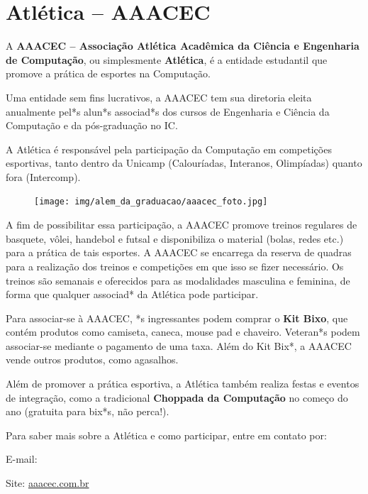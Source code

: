 
\section{Atlética -- AAACEC}

A \textbf{AAACEC -- Associação Atlética Acadêmica da Ciência e Engenharia de
Computação}, ou simplesmente \textbf{Atlética}, é a entidade estudantil que
promove a prática de esportes na Computação.

Uma entidade sem fins lucrativos, a AAACEC tem sua diretoria eleita anualmente
pel*s alun*s associad*s dos cursos de Engenharia e Ciência da Computação e da
pós-graduação no IC.

A Atlética é responsável pela participação da Computação em competições
esportivas, tanto dentro da Unicamp (Calouríadas, Interanos, Olimpíadas) quanto
fora (Intercomp).

\begin{figure}[H]
    \centering
    \texttt{[image: img/alem\_da\_graduacao/aaacec\_foto.jpg]}
\end{figure}

A fim de possibilitar essa participação, a AAACEC promove treinos regulares de
basquete, vôlei, handebol e futsal e disponibiliza o material (bolas, redes
etc.) para a prática de tais esportes. A AAACEC se encarrega da reserva de
quadras para a realização dos treinos e competições em que isso se fizer
necessário. Os treinos são semanais e oferecidos para as modalidades masculina e
feminina, de forma que qualquer associad* da Atlética pode participar.

Para associar-se à AAACEC, *s ingressantes podem comprar o \textbf{Kit Bixo},
que contém produtos como camiseta, caneca, mouse pad e chaveiro. Veteran*s podem
associar-se mediante o pagamento de uma taxa. Além do Kit Bix*, a AAACEC vende
outros produtos, como agasalhos.

Além de promover a prática esportiva, a Atlética também realiza festas e eventos
de integração, como a tradicional \textbf{Choppada da Computação} no começo do
ano (gratuita para bix*s, não perca!).

Para saber mais sobre a Atlética e como participar, entre em contato por:

\begin{compactitemize}
\item E-mail: 
\item Site: \url{aaacec.com.br}
\end{compactitemize}


